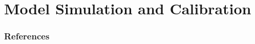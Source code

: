 \documentclass[11pt,aspectratio=169]{beamer}
\begin{document}
%
%
%


\section{Model Simulation and Calibration}

\begin{frame}[allowframebreaks]%
\frametitle{References}
\scriptsize{
\printbibliography}
\end{frame}
\end{document}

